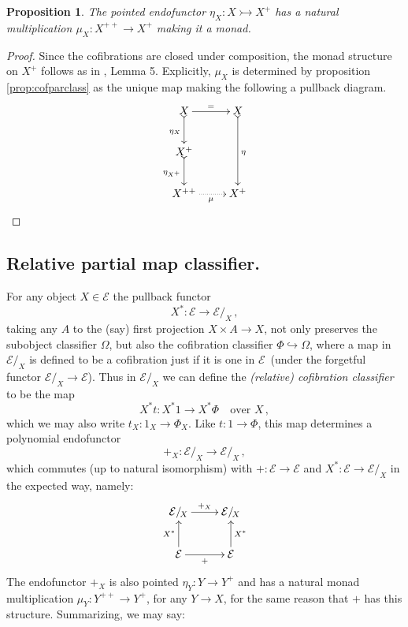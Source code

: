 \documentclass[11pt,reqno]{amsart}
\newcommand{\EE}{\ensuremath{\mathcal{E}}}
\newcommand{\slice}[1]{\ensuremath{/_{\!{#1}}}}
\newcommand{\hook}{\ensuremath{\hookrightarrow}}
\newcommand{\mono}{\ensuremath{\rightarrowtail}}
\newcommand{\ra}{\ensuremath{\rightarrow}}
\renewcommand{\to}{\ensuremath{\rightarrow}}
\newcommand{\too}{\ensuremath{\longrightarrow}}
\newtheorem{proposition}[theorem]{Proposition}
\theoremstyle{remark}
\theoremstyle{definition}
\begin{document}

\begin{proposition}\label{prop:plusmonad}
The pointed endofunctor  $\eta_X : X\mono X^+$ has a natural multiplication $\mu_X : X^{++} \ra X^+$ making it a monad.
\end{proposition}

\begin{proof}
Since the cofibrations are closed under composition, the monad structure on $X^+$ follows as in \cite{A:natural}, Lemma 5.  Explicitly, $\mu_X$ is determined by proposition \ref{prop:cofparclass} as the unique map making the following a pullback diagram.
\[
\xymatrix{
X \ar@{>->}[d]_{\eta_X} \ar[r]^= & X \ar@{>->}[dd]^{\eta}\\
X^+ \ar@{>->}[d]_{\eta_{X^+}} & \\
X^{++} \ar@{.>}[r]_\mu & X^+
}
\]
\end{proof}

\subsection*{Relative partial map classifier.}

For any object $X\in\EE$ the pullback functor 
\[
X^* : \EE \ra \EE\slice{X}\,,
\]
taking any $A$ to the (say) first projection $X\times A \ra X$, not only preserves the subobject classifier $\Omega$, but also the cofibration classifier $\Phi \hook \Omega$, where a map in $\EE\slice{X}$ is defined to be a cofibration just if it is one in \EE\ (under the forgetful functor $\EE\slice{X} \to \EE$). Thus in $\EE\slice{X}$ we can define the \emph{(relative) cofibration classifier} to be the map
\[
X^*t : X^*1 \too X^*\Phi	\quad\text{over $X$}\,,
\]
which we may also write $t_X : 1_X \ra \Phi_X$.  Like $t : 1\ra \Phi$, this map determines a polynomial endofunctor  
\[
+_X : \EE\slice{X} \ra \EE\slice{X}\,,
\]
 which commutes (up to natural isomorphism) with $+ : \EE \ra \EE$ and $X^* : \EE \ra \EE\slice{X}$ in the expected way, namely:
\begin{equation}\label{diag:+fibered}
\xymatrix{
\EE\slice{X} \ar[r]^{+_X}& \EE\slice{X} \\
\EE \ar[u]^{X^*} \ar[r]_+ & \ar[u]_{X^*}\EE 
}
\end{equation}
The endofunctor $+_X$ is also pointed $\eta_Y : Y \ra Y^+$ and has a natural monad multiplication $\mu_Y : Y^{++} \ra Y^+$, for any $Y\ra X$, for the same reason that $+$ has this structure.  Summarizing, we may say:
\end{document}
